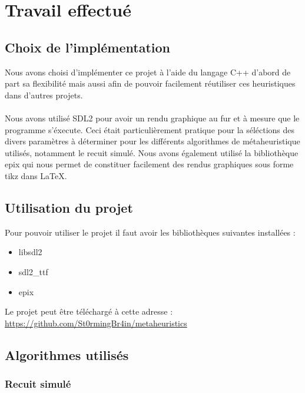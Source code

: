 \section{Travail effectué}

\subsection{Choix de l'implémentation}

Nous avons choisi d'implémenter ce projet à l'aide du langage C++ d'abord de part sa flexibilité mais aussi afin de pouvoir facilement réutiliser ces heuristiques dans d'autres projets.\\ \\
Nous avons utilisé SDL2 pour avoir un rendu graphique au fur et à mesure que le programme s'éxecute. Ceci était particulièrement pratique pour la séléctions des divers paramètres à déterminer pour les différents algorithmes de métaheuristique utilisés, notamment le recuit simulé. Nous avons également utilisé la bibliothèque epix qui nous permet de constituer facilement des rendus graphiques sous forme tikz dans \LaTeX.

\subsection{Utilisation du projet}

Pour pouvoir utiliser le projet il faut avoir les bibliothèques suivantes installées :
\begin{itemize}
    \item libsdl2
    \item sdl2\_ttf
    \item epix
\end{itemize}

\begin{noindent}
Le projet peut être téléchargé à cette adresse : \\ 
\url{https://github.com/St0rmingBr4in/metaheuristics}
\end{noindent}

\newpage


\subsection{Algorithmes utilisés}
\subsubsection{Recuit simulé}

